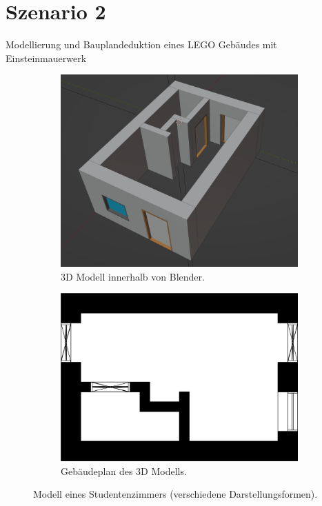 \section{Szenario 2}\label{scenarios:scenario2}
Modellierung und Bauplandeduktion eines LEGO Gebäudes mit Einsteinmauerwerk
\begin{figure}[ht]
  \begin{subfigure}[b]{0.44\columnwidth}
    \includegraphics[width=\columnwidth]{fig/scenario1_screenshot.png}
    \caption{3D Modell innerhalb von Blender.}
    \label{fig:Scenario1 Screenshot}
  \end{subfigure}
  \hfill
  \begin{subfigure}[b]{0.505\columnwidth}
    \includegraphics[width=\columnwidth]{fig/scenario1_story_plan.jpg}
    \caption{Gebäudeplan des 3D Modells.}
    \label{fig:Scenario1 Gebäudeplan}
  \end{subfigure}
  \label{fig:Scenario1 komplett}
  \caption{Modell eines Studentenzimmers (verschiedene Darstellungsformen).}
\end{figure}
